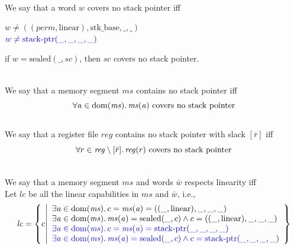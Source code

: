 \documentclass[a3paper]{article}
\newcommand{\dom}{\mathrm{dom}}
\newcommand{\sourcecolor}{\color{blue}}
\newcommand{\src}[1]{{\sourcecolor #1}}
\newcommand{\shareddom}[1]{\mathrm{#1}}
\newcommand{\perm}{\var{perm}}
\newcommand{\stkptr}[1]{\mathrm{stack\text{-}ptr}(#1)}
\newcommand{\sealed}[1]{\shareddom{sealed}(#1)}
\newcommand{\var}[1]{\mathit{#1}}
\newcommand{\reg}{\var{reg}}
\newcommand{\ms}{\var{ms}}
\newcommand{\vsc}{\var{sc}}
\newcommand{\aaddr}{\var{a}}
\newcommand{\constant}[1]{\mathrm{#1}}
\newcommand{\stkb}{\constant{stk\_base}}
\newcommand{\plainlinearity}[1]{\mathrm{#1}}
\newcommand{\linear}{\plainlinearity{linear}}
\begin{document}
\begin{definition}
  \label{def:no-stk-ptr}
~\\
  We say that a word $w$ covers no stack pointer iff\\
  \begin{item}
    \item $w \neq ((\perm,\linear),\stkb,\_,\_)$\\
          $\src{w \neq \stkptr{\_,\_,\_,\_}}$
    \item if $w = \sealed{\_,\vsc}$, then $\vsc$ covers no stack pointer.
  \end{item}
~\\
  We say that a memory segment $\ms$ contains no stack pointer iff
  \[
    \forall \aaddr \in \dom(\ms)\ldotp \text{$\ms(\aaddr)$ covers no stack pointer}
  \]
~\\
  We say that a register file $\reg$ contains no stack pointer with slack $[\bar{r}]$ iff
  \[
    \forall r \in \reg \setminus [\bar{r}] \ldotp \text{$\reg(r)$ covers no stack pointer}
  \]
\end{definition}

\begin{definition}
  \label{def:resp-linearity}
~\\
  We say that a memory segment $\ms$ and words $\bar{w}$ respects linearity iff\\
  Let $\var{lc}$ be all the linear capabilities in $\ms$ and $\bar{w}$, i.e.,
  \[
    \var{lc} = \left\{c \middle|
      \begin{array}{l}
        \exists \aaddr \in \dom(\ms) \ldotp c = \ms(\aaddr) = ((\_,\linear),\_,\_,\_) \\
        \exists \aaddr \in \dom(\ms) \ldotp \ms(\aaddr) = \sealed{\_,c} \land c = ((\_,\linear),\_,\_,\_) \\
        \src{\exists \aaddr \in \dom(\ms) \ldotp c = \ms(\aaddr) = \stkptr{\_,\_,\_,\_}} \\
        \src{\exists \aaddr \in \dom(\ms) \ldotp \ms(\aaddr) = \sealed{\_,c} \land c= \stkptr{\_,\_,\_,\_}} \\
      \end{array}
\right\}
  \]
\end{definition}
\end{document}
